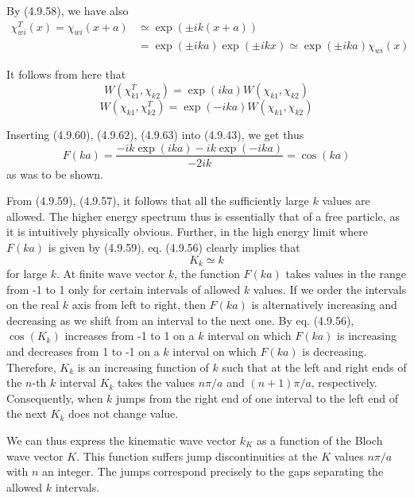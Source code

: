 \documentclass{article}
\begin{document}
By (4.9.58), we have also
$$
\begin{align*}
\chi_{w i}^{T}(x)=\chi_{w i}(x+a) & \simeq \exp ( \pm i k(x+a))  \tag{4.9.61}\\
& =\exp ( \pm i k a) \exp ( \pm i k x) \simeq \exp ( \pm i k a) \chi_{w i}(x)
\end{align*}
$$

It follows from here that
$$
\begin{equation*}
W\left(\chi_{k 1}^{T}, \chi_{k 2}\right)=\exp (i k a) W\left(\chi_{k 1}, \chi_{k 2}\right) \tag{4.9.62}
\end{equation*}
$$
$$
\begin{equation*}
W\left(\chi_{k 1}, \chi_{k 2}^{T}\right)=\exp (-i k a) W\left(\chi_{k 1}, \chi_{k 2}\right) \tag{4.9.63}
\end{equation*}
$$

Inserting (4.9.60), (4.9.62), (4.9.63) into (4.9.43), we get thus
$$
\begin{equation*}
F(k a)=\frac{-i k \exp (i k a)-i k \exp (-i k a)}{-2 i k}=\cos (k a) \tag{4.9.64}
\end{equation*}
$$
as was to be shown.

From (4.9.59), (4.9.57), it follows that all the sufficiently large $k$ values are allowed. The higher energy spectrum thus is essentially that of a free particle, as it is intuitively physically obvious. Further, in the high energy limit where $F(k a)$ is given by (4.9.59), eq. (4.9.56) clearly implies that
$$
\begin{equation*}
K_{k} \simeq k \tag{4.9.65}
\end{equation*}
$$
for large $k$.
At finite wave vector $k$, the function $F(k a)$ takes values in the range from -1 to 1 only for certain intervals of allowed $k$ values. If we order the intervals on the real $k$ axis from left to right, then $F(k a)$ is alternatively increasing and decreasing as we shift from an interval to the next one. By eq. (4.9.56), $\cos \left(K_{k}\right)$ increases from -1 to 1 on a $k$ interval on which $F(k a)$ is increasing and decreases from 1 to -1 on a $k$ interval on which $F(k a)$ is decreasing. Therefore, $K_{k}$ is an increasing function of $k$ such that at the left and right ends of the $n$-th $k$ interval $K_{k}$ takes the values $n \pi / a$ and $(n+1) \pi / a$, respectively. Consequently, when $k$ jumps from the right end of one interval to the left end of the next $K_{k}$ does not change value.

We can thus express the kinematic wave vector $k_{K}$ as a function of the Bloch wave vector $K$. This function suffers jump discontinuities at the $K$ values $n \pi / a$ with $n$ an integer. The jumps correspond precisely to the gaps separating the allowed $k$ intervals.
\end{document}
